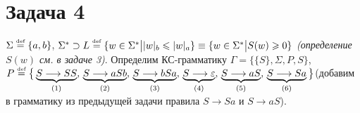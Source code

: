 \documentclass[a4paper]{article}
\def\eqdef{\overset{\mbox{\tiny def}}{=}}
\begin{document}
\section*{Задача 4}
$\Sigma\eqdef\{a,b\}$, $\Sigma^*\supset L\eqdef\{w\in\Sigma^*\big||w|_b\leqslant|w|_a\}\equiv\{w\in\Sigma^*\big|S(w)\geqslant 0\}$ {\em (определение $S(w)$ см. в задаче 3)}.\newline
Определим КС-грамматику $\Gamma=\{\{S\},\Sigma,P,S\}$,\newline
$P\eqdef\big\{\underbrace{S\longrightarrow SS}_{(1)},\,\underbrace{S\longrightarrow aSb}_{(2)},\,\underbrace{S\longrightarrow bSa}_{(3)},\,\underbrace{S\longrightarrow \varepsilon}_{(4)},\,\underbrace{S\longrightarrow aS}_{(5)},\,\underbrace{S\longrightarrow Sa}_{(6)}\big\}$\newline (добавим в грамматику из предыдущей задачи правила $S\longrightarrow Sa$ и $S\longrightarrow aS$).\newline
\end{document}
